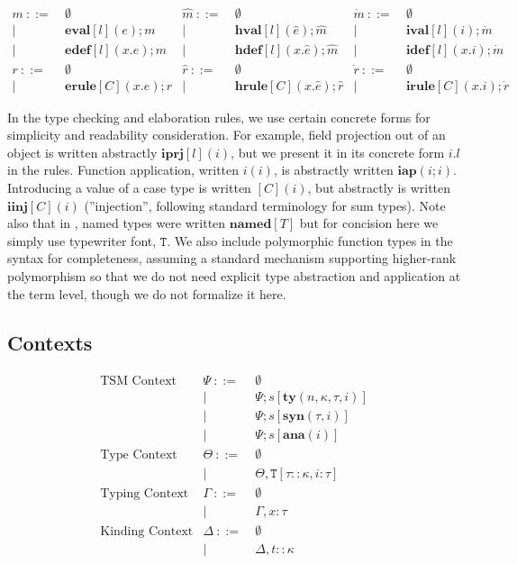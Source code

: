 \documentclass{sig-alternate}
\newcommand{\T}{\mathtt{T}}
\begin{document}
\[\begin{array}{rlrlrl}
  m       ~::=&~ \emptyset            &\hat{m}  ~::=&~ \emptyset                &\dot{m}  ~::=&~ \emptyset\\
        | ~ &~ \mathbf{eval}[l](e);m      &     | ~ &~ \mathbf{hval}[l](\hat{e});\hat{m}    &     | ~ &~ \mathbf{ival}[l](i);\dot{m}\\
        | ~ &~ \mathbf{edef}[l](x.e);m      &     | ~ &~ \mathbf{hdef}[l](x.\hat{e});\hat{m}    &     | ~ &~ \mathbf{idef}[l](x.i);\dot{m}\\
  r       ~::=&~ \emptyset            &\hat{r}  ~::=&~ \emptyset                &\dot{r}  ~::=&~ \emptyset\\
        | ~ &~ \mathbf{erule}[C](x.e);r     &       | ~ &~ \mathbf{hrule}[C](x.\hat{e});\hat{r}   &     | ~ &~ \mathbf{irule}[C](x.i);\dot{r}
\end{array}
\]


In the type checking and elaboration rules, we use certain concrete forms for simplicity and readability consideration. For example, field projection out of an object is written abstractly $\mathbf{iprj}[l](i)$, but we present it in its concrete form $i.l$ in the rules. Function application, written $i(i)$, is abstractly written $\mathbf{iap}(i;i)$. Introducing a value of a case type is written $[C](i)$, but abstractly is written $\mathbf{iinj}[C](i)$ (''injection'', following standard terminology for sum types). Note also that in \cite{TSLs},  named types were written $\mathbf{named}[T]$ but for concision here we simply use typewriter font, $\mathtt{T}$. We also include polymorphic function types in the syntax for completeness, assuming a standard mechanism supporting higher-rank polymorphism so that we do not need explicit type abstraction and application at the term level, though we do not formalize it here.

\subsection{Contexts}
\[
\begin{array}{rrl}
\text{TSM Context}  & \Psi  ~::=&~  \emptyset\\
            &     | ~ &~  \Psi;s[\mathbf{ty}(n,\kappa,\tau,i)]\\
            &     | ~ &~  \Psi;s[\mathbf{syn}(\tau,i)]\\
            &     | ~ &~  \Psi;s[\mathbf{ana}(i)]\\
\text{Type Context}   & \Theta  ~::=&~ \emptyset\\
            &     | ~ &~ \Theta,\T[\tau::\kappa,i:\tau] \\
\text{Typing Context} & \Gamma  ~::=&~ \emptyset\\
            &     | ~ &~ \Gamma,x:\tau\\
\text{Kinding Context}  &   \Delta  ~::=&~ \emptyset\\
            &       | ~ &~ \Delta,t::\kappa\\
\end{array}
\]
\end{document}
